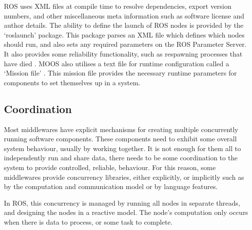 \documentclass[../dissertation.tex]{subfiles}
\begin{document}
ROS uses XML files at compile time to resolve dependencies, export version numbers, and other miscellaneous meta information such as software license and author details. The ability to define the launch of ROS nodes is provided by the `roslaunch' package. This package parses an XML file which defines which nodes should run, and also sets any required parameters on the ROS Parameter Server. It also provides some reliability functionality, such as respawning processes that have died \cite{roslaunchPage}. MOOS also utilises a text file for runtime configuration called a `Mission file' \cite{newman2009introduction}. This mission file provides the necessary runtime parameters for components to set themselves up in a system.

\subsection{Coordination}

Most middlewares have explicit mechanisms for creating multiple concurrently running software components. These components need to exhibit some overall system behaviour, usually by working together. It is not enough for them all to independently run and share data, there needs to be some coordination to the system to provide controlled, reliable, behaviour. For this reason, some middlewares provide concurrency libraries, either explicitly, or implicitly such as by the computation and communication model or by language features.

In ROS, this concurrency is managed by running all nodes in separate threads, and designing the nodes in a reactive model. The node's computation only occurs when there is data to process, or some task to complete.
\end{document}

